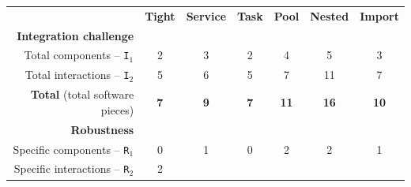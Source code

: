 \documentclass[preprint,3p,twocolumn]{elsarticle}
\begin{document}
\begin{table}
\footnotesize
\centering
\begin{tabular}{rcccccc}
                                     & \textbf{Tight}
                                     & \textbf{Service}
                                     & \textbf{Task}
                                     & \textbf{Pool}
                                     & \textbf{Nested}
                                     & \textbf{Import} \\
\cellcolor[HTML]{EEEEEE}\textbf{Integration challenge}& \multicolumn{6}{l}{\cellcolor[HTML]{EEEEEE}}\\
  Total components -- \texttt{I$_1$} & \cellcolor[HTML]{99FF99}2
                                     & \cellcolor[HTML]{99DD99}3
                                     & \cellcolor[HTML]{99FF99}2
                                     & \cellcolor[HTML]{99BB99}4
                                     & \cellcolor[HTML]{999999}5
                                     & \cellcolor[HTML]{99DD99}3\\
Total interactions -- \texttt{I$_2$} & \cellcolor[HTML]{99FF99}5
                                     & \cellcolor[HTML]{99EE99}6
                                     & \cellcolor[HTML]{99FF99}5
                                     & \cellcolor[HTML]{99DD99}7
                                     & \cellcolor[HTML]{999999}11
                                     & \cellcolor[HTML]{99DD99}7\\
\textbf{Total} (total software pieces) & \cellcolor[HTML]{99FF99}\textbf{7}
                                     & \cellcolor[HTML]{99E899}\textbf{9}
                                     & \cellcolor[HTML]{99FF99}\textbf{7}
                                     & \cellcolor[HTML]{99D299}\textbf{11}
                                     & \cellcolor[HTML]{999999}\textbf{16}
                                     & \cellcolor[HTML]{99DD99}\textbf{10}\\
\cellcolor[HTML]{EEEEEE}\textbf{Robustness}& \multicolumn{6}{l}{\cellcolor[HTML]{EEEEEE}}\\
Specific components -- \texttt{R$_1$} & \cellcolor[HTML]{99FF99}0
                                     & \cellcolor[HTML]{99CC99}1
                                     & \cellcolor[HTML]{99FF99}0
                                     & \cellcolor[HTML]{999999}2
                                     & \cellcolor[HTML]{999999}2
                                     & \cellcolor[HTML]{99CC99}1\\
  Specific interactions -- \texttt{R$_2$} & \cellcolor[HTML]{99EB99}2

\end{tabular}
\end{table}
\end{document}
